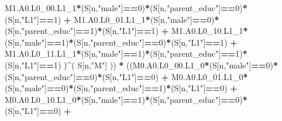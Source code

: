 \documentclass[
]{book}
\newenvironment{Shaded}{\begin{snugshade}}{\end{snugshade}}
\newcommand{\DecValTok}[1]{\textcolor[rgb]{0.00,0.00,0.81}{#1}}
\newcommand{\NormalTok}[1]{#1}
\newcommand{\SpecialCharTok}[1]{\textcolor[rgb]{0.81,0.36,0.00}{\textbf{#1}}}
\newcommand{\StringTok}[1]{\textcolor[rgb]{0.31,0.60,0.02}{#1}}
\begin{document}
\begin{Shaded}
\begin{Highlighting}[]
\NormalTok{          M1.A0.L0\_00.L1\_1}\SpecialCharTok{*}\NormalTok{(S[n,}\StringTok{"male"}\NormalTok{]}\SpecialCharTok{==}\DecValTok{0}\NormalTok{)}\SpecialCharTok{*}\NormalTok{(S[n,}\StringTok{"parent\_educ"}\NormalTok{]}\SpecialCharTok{==}\DecValTok{0}\NormalTok{)}\SpecialCharTok{*}\NormalTok{(S[n,}\StringTok{"L1"}\NormalTok{]}\SpecialCharTok{==}\DecValTok{1}\NormalTok{) }\SpecialCharTok{+}
\NormalTok{          M1.A0.L0\_01.L1\_1}\SpecialCharTok{*}\NormalTok{(S[n,}\StringTok{"male"}\NormalTok{]}\SpecialCharTok{==}\DecValTok{0}\NormalTok{)}\SpecialCharTok{*}\NormalTok{(S[n,}\StringTok{"parent\_educ"}\NormalTok{]}\SpecialCharTok{==}\DecValTok{1}\NormalTok{)}\SpecialCharTok{*}\NormalTok{(S[n,}\StringTok{"L1"}\NormalTok{]}\SpecialCharTok{==}\DecValTok{1}\NormalTok{) }\SpecialCharTok{+}
\NormalTok{          M1.A0.L0\_10.L1\_1}\SpecialCharTok{*}\NormalTok{(S[n,}\StringTok{"male"}\NormalTok{]}\SpecialCharTok{==}\DecValTok{1}\NormalTok{)}\SpecialCharTok{*}\NormalTok{(S[n,}\StringTok{"parent\_educ"}\NormalTok{]}\SpecialCharTok{==}\DecValTok{0}\NormalTok{)}\SpecialCharTok{*}\NormalTok{(S[n,}\StringTok{"L1"}\NormalTok{]}\SpecialCharTok{==}\DecValTok{1}\NormalTok{) }\SpecialCharTok{+}
\NormalTok{          M1.A0.L0\_11.L1\_1}\SpecialCharTok{*}\NormalTok{(S[n,}\StringTok{"male"}\NormalTok{]}\SpecialCharTok{==}\DecValTok{1}\NormalTok{)}\SpecialCharTok{*}\NormalTok{(S[n,}\StringTok{"parent\_educ"}\NormalTok{]}\SpecialCharTok{==}\DecValTok{1}\NormalTok{)}\SpecialCharTok{*}
\NormalTok{          (S[n,}\StringTok{"L1"}\NormalTok{]}\SpecialCharTok{==}\DecValTok{1}\NormalTok{) )}\SpecialCharTok{\^{}}\NormalTok{( S[n,}\StringTok{"M"}\NormalTok{] )) }\SpecialCharTok{*}
\NormalTok{      ((M0.A0.L0\_00.L1\_0}\SpecialCharTok{*}\NormalTok{(S[n,}\StringTok{"male"}\NormalTok{]}\SpecialCharTok{==}\DecValTok{0}\NormalTok{)}\SpecialCharTok{*}\NormalTok{(S[n,}\StringTok{"parent\_educ"}\NormalTok{]}\SpecialCharTok{==}\DecValTok{0}\NormalTok{)}\SpecialCharTok{*}\NormalTok{(S[n,}\StringTok{"L1"}\NormalTok{]}\SpecialCharTok{==}\DecValTok{0}\NormalTok{) }\SpecialCharTok{+}               
\NormalTok{          M0.A0.L0\_01.L1\_0}\SpecialCharTok{*}\NormalTok{(S[n,}\StringTok{"male"}\NormalTok{]}\SpecialCharTok{==}\DecValTok{0}\NormalTok{)}\SpecialCharTok{*}\NormalTok{(S[n,}\StringTok{"parent\_educ"}\NormalTok{]}\SpecialCharTok{==}\DecValTok{1}\NormalTok{)}\SpecialCharTok{*}\NormalTok{(S[n,}\StringTok{"L1"}\NormalTok{]}\SpecialCharTok{==}\DecValTok{0}\NormalTok{) }\SpecialCharTok{+}
\NormalTok{          M0.A0.L0\_10.L1\_0}\SpecialCharTok{*}\NormalTok{(S[n,}\StringTok{"male"}\NormalTok{]}\SpecialCharTok{==}\DecValTok{1}\NormalTok{)}\SpecialCharTok{*}\NormalTok{(S[n,}\StringTok{"parent\_educ"}\NormalTok{]}\SpecialCharTok{==}\DecValTok{0}\NormalTok{)}\SpecialCharTok{*}\NormalTok{(S[n,}\StringTok{"L1"}\NormalTok{]}\SpecialCharTok{==}\DecValTok{0}\NormalTok{) }\SpecialCharTok{+} 

\end{Highlighting}
\end{Shaded}
\end{document}
